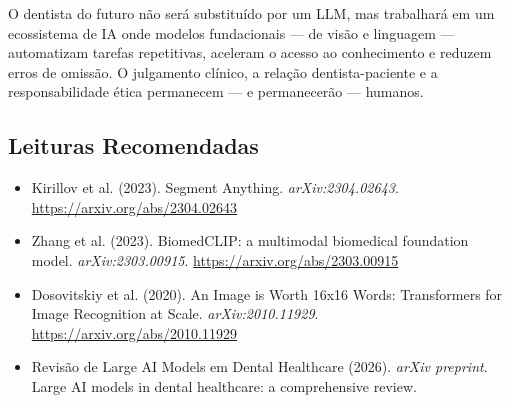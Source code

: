 O dentista do futuro não será substituído por um LLM, mas trabalhará em um ecossistema de IA onde modelos fundacionais --- de visão e linguagem --- automatizam tarefas repetitivas, aceleram o acesso ao conhecimento e reduzem erros de omissão. O julgamento clínico, a relação dentista-paciente e a responsabilidade ética permanecem --- e permanecerão --- humanos.

\subsection*{Leituras Recomendadas}
\begin{itemize}
    \item Kirillov et al. (2023). Segment Anything. \textit{arXiv:2304.02643}. \url{https://arxiv.org/abs/2304.02643}
    \item Zhang et al. (2023). BiomedCLIP: a multimodal biomedical foundation model. \textit{arXiv:2303.00915}. \url{https://arxiv.org/abs/2303.00915}
    \item Dosovitskiy et al. (2020). An Image is Worth 16x16 Words: Transformers for Image Recognition at Scale. \textit{arXiv:2010.11929}. \url{https://arxiv.org/abs/2010.11929}
    \item Revisão de Large AI Models em Dental Healthcare (2026). \textit{arXiv preprint}. Large AI models in dental healthcare: a comprehensive review.
\end{itemize}
